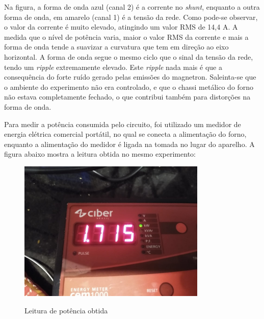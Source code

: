 Na figura, a forma de onda azul (canal 2) é a corrente no \textit{shunt}, enquanto a outra forma de onda, em amarelo (canal 1) é a tensão da rede. Como pode-se observar, o valor da corrente é muito elevado, atingindo um valor RMS de 14,4 A.  A medida que o nível de potência varia, maior o valor RMS da corrente e mais a forma de onda tende a suavizar a curvatura que tem em direção ao eixo horizontal. A forma de onda segue o mesmo ciclo que o sinal da tensão da rede, tendo um \textit{ripple} extremamente elevado. Este \textit{ripple} nada mais é que a consequência do forte ruído gerado pelas emissões do magnetron. Saleinta-se que o ambiente do experimento não era controlado, e que o chassi metálico do forno não estava completamente fechado, o que contribui também para distorções na forma de onda.

Para medir a potência consumida pelo circuito, foi utilizado um medidor de energia elétrica comercial portátil, no qual se conecta a alimentação do forno, enquanto a alimentação do medidor é ligada na tomada no lugar do aparelho. A figura abaixo mostra a leitura obtida no mesmo experimento:

\begin{figure}[H]
    \centering
    \caption{Leitura de potência obtida}
    \includegraphics[width=0.8\textwidth]{./dados/figuras/medida_potencia_full}
    \label{fig:figura-medida_potencia_full}
\end{figure}

